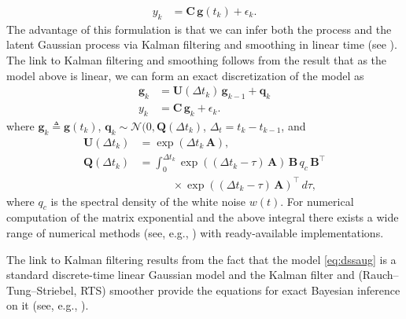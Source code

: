 \documentclass[journal]{IEEEtran}
\begin{document}
%
\begin{equation}
\begin{split}
  y_k &= \mathbf{C} \, \mathbf{g}(t_k) + \epsilon_k.
\end{split}
\label{eq:ssaugkf}
\end{equation}
%
The advantage of this formulation is that we can infer both the process and the latent Gaussian process via Kalman
filtering and smoothing in linear time (see \cite{Hartikainen+Sarkka:2010,Sarkka+Solin+Hartikainen:2013}). The link to
Kalman filtering and smoothing follows from the result that as the model above is linear, we can form an exact
discretization of the model as
%
\begin{equation}
\begin{split}
  \mathbf{g}_k
  &= \mathbf{U}(\Delta t_k) \, \mathbf{g}_{k-1}
  + \mathbf{q}_k \\
  y_k &= \mathbf{C} \, \mathbf{g}_k + \epsilon_k.
\end{split}
\label{eq:dssaug}
\end{equation}
%
where $\mathbf{g}_k \triangleq \mathbf{g}(t_k)$, $\mathbf{q}_k \sim \mathcal{N}(0,\mathbf{Q}(\Delta t_k)$, $\Delta_t = t_k - t_{k-1}$, and
%
\begin{equation}
\begin{split}
  \mathbf{U}(\Delta t_k)  &= \exp(\Delta t_k \, \mathbf{A}), \\
  \mathbf{Q}(\Delta t_k) &= \int_0^{\Delta t_k} \exp((\Delta t_k - \tau) \, \mathbf{A}) \,
  \mathbf{B} \, q_c  \, \mathbf{B}^{\top} \\
  &\qquad \quad \times \exp((\Delta t_k - \tau) \, \mathbf{A})^{\top} \, d\tau,
\end{split}
\end{equation}
%
where $q_c$ is the spectral density of the white noise $w(t)$. For numerical computation of the matrix exponential and the above integral there exists a wide range of numerical methods (see, e.g., \cite{Grewal+Andrews:2001,Sarkka:2006}) with ready-available implementations.

The link to Kalman filtering results from the fact that the model \eqref{eq:dssaug} is a standard discrete-time linear Gaussian model and the Kalman filter and (Rauch--Tung--Striebel, RTS) smoother provide the equations for exact Bayesian inference on it (see, e.g., \cite{Sarkka:2013}). 
\end{document}
